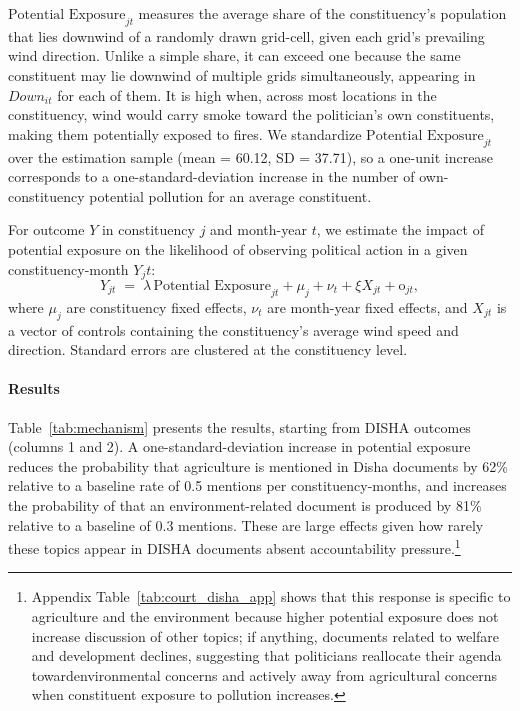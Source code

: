 \documentclass[12pt]{article}
\providecommand{\omicron}{\mathrm{o}}
\begin{document}
$\text{Potential Exposure}_{jt}$ measures the average share of the constituency's population that lies downwind of a randomly drawn grid-cell, given each grid's prevailing wind direction. Unlike a simple share, it can exceed one because the same constituent may lie downwind of multiple grids simultaneously, appearing in $\textit{Down}_{it}$ for each of them. It is high when, across most locations in the constituency, wind would carry smoke toward the politician's own constituents, making them potentially exposed to fires. %
We standardize $\text{Potential Exposure}_{jt}$ over the estimation sample (mean = 60.12, SD = 37.71), so a one-unit increase corresponds to a one-standard-deviation increase in the number of own-constituency potential pollution for an average constituent. 

For outcome $Y$ in constituency $j$ and month-year $t$, we estimate the impact of potential exposure on the likelihood of observing political action in a given constituency-month $Y_jt$:
\begin{equation}
Y_{jt} \;=\; \lambda \, \text{Potential Exposure}_{jt} + \mu_j + \nu_t + \xi X_{jt} + \omicron_{jt},
\label{eq:mech}
\end{equation}
where $\mu_j$ are constituency fixed effects, $\nu_t$ are month-year fixed effects, and $X_{jt}$ is a vector of controls containing the constituency's average wind speed and direction. Standard errors are clustered at the constituency level.



\paragraph{Results}

Table~\ref{tab:mechanism} presents the results, starting from DISHA outcomes (columns 1 and 2). A one-standard-deviation increase in potential exposure reduces the probability that agriculture is mentioned in Disha documents by 62\% relative to a baseline rate of 0.5 mentions per constituency-months, and increases the probability of that an environment-related document is produced by 81\% relative to a baseline of 0.3 mentions. These are large effects given how rarely these topics appear in DISHA documents absent accountability pressure.\footnote{Appendix Table~\ref{tab:court_disha_app} shows that this response is specific to agriculture and the environment because higher potential exposure does not increase discussion of other topics; if anything, documents related to welfare and development declines, suggesting that politicians reallocate their agenda towardenvironmental concerns and actively away from agricultural concerns when constituent exposure to pollution increases.}
\end{document}
